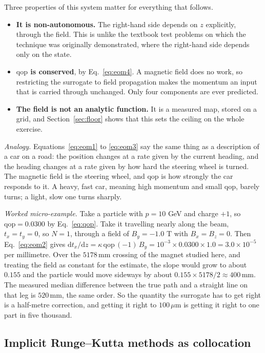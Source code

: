 \documentclass[11pt,a4paper]{article}
\newcommand{\um}{\ensuremath{\,\mu\mathrm{m}}}
\newcommand{\mm}{\ensuremath{\,\mathrm{mm}}}
\newcommand{\qop}{\ensuremath{\mathrm{qop}}}
\begin{document}
Three properties of this system matter for everything that follows.

\begin{itemize}
  \item \textbf{It is non-autonomous.} The right-hand side depends on $z$
  explicitly, through the field. This is unlike the textbook test problems on
  which the technique was originally demonstrated, where the right-hand side
  depends only on the state.
  \item \textbf{$\qop$ is conserved}, by Eq.~\eqref{eq:eom4}. A magnetic field
  does no work, so restricting the surrogate to field propagation makes the
  momentum an input that is carried through unchanged. Only four components are
  ever predicted.
  \item \textbf{The field is not an analytic function.} It is a measured map,
  stored on a grid, and Section~\ref{sec:floor} shows that this sets the ceiling
  on the whole exercise.
\end{itemize}

\emph{Analogy.} Equations~\eqref{eq:eom1} to \eqref{eq:eom3} say the same thing
as a description of a car on a road: the position changes at a rate given by the
current heading, and the heading changes at a rate given by how hard the
steering wheel is turned. The magnetic field is the steering wheel, and $\qop$
is how strongly the car responds to it. A heavy, fast car, meaning high momentum
and small $\qop$, barely turns; a light, slow one turns sharply.

\emph{Worked micro-example.} Take a particle with $p = 10$ GeV and charge $+1$,
so $\qop = 0.0300$ by Eq.~\eqref{eq:qop}. Take it travelling nearly along the
beam, $t_x = t_y = 0$, so $N = 1$, through a field of $B_y = -1.0$ T with
$B_x = B_z = 0$. Then Eq.~\eqref{eq:eom2} gives
$\mathrm{d}t_x/\mathrm{d}z = \kappa\,\qop\,(-1)\,B_y
 = 10^{-3} \times 0.0300 \times 1.0 = 3.0 \times 10^{-5}$ per millimetre. Over
the $5178\mm$ crossing of the magnet studied here, and treating the field as
constant for the estimate, the slope would grow to about $0.155$ and the
particle would move sideways by about
$0.155 \times 5178 / 2 \approx 400\mm$. The measured median difference between
the true path and a straight line on that leg is $520\mm$, the same order. So
the quantity the surrogate has to get right is a half-metre correction, and
getting it right to $100\um$ is getting it right to one part in five thousand.

\subsection{Implicit Runge--Kutta methods as collocation}
\label{sec:irk}
\end{document}
